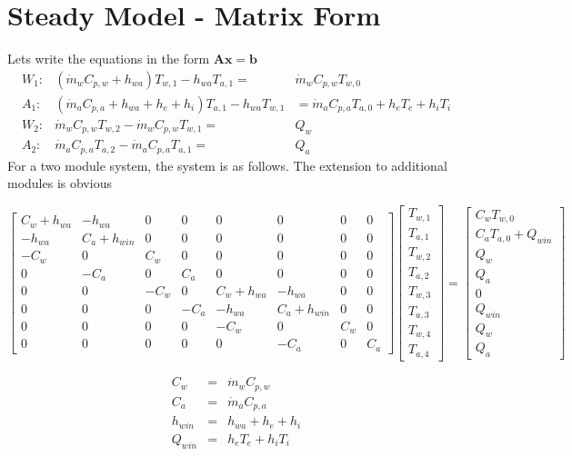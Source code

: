 \documentclass[11pt]{article}
\begin{document}
\section{Steady Model - Matrix Form}
Lets write the equations in the form $\mathbf{A}\mathbf{x}=\mathbf{b}$
\begin{eqnarray} 
W_1: &  (\dot{m}_wC_{p,w}+h_{wa})T_{w,1} - h_{wa}T_{a,1} = &\dot{m}_wC_{p,w}T_{w,0}  \\
A_1: &  (\dot{m}_aC_{p,a}+h_{wa}+h_e+h_i)T_{a,1} -h_{wa}T_{w,1} &= \dot{m}_aC_{p,a}T_{a,0} +h_eT_e+h_iT_i \\
W_2: &  \dot{m}_wC_{p,w}T_{w,2}-\dot{m}_wC_{p,w}T_{w,1} = &Q_w\\
A_2: &  \dot{m}_aC_{p,a}T_{a,2}-\dot{m}_aC_{p,a}T_{a,1} = &Q_a
\label{eq:steady2}
\end{eqnarray}
For a two module system, the system is as follows. The extension to additional modules is obvious
\begin{landscape}

\begin{equation}
\left[ \begin{array}{cccccccc} C_w+h_{wa}& - h_{wa} & 0 & 0 & 0 & 0 & 0 & 0 \\-h_{wa} & C_a+h_{win} & 0 & 0 & 0 & 0 & 0 & 0 \\ -C_w & 0 & C_w & 0 & 0 & 0 & 0 & 0 \\ 0 & -C_a & 0 & C_a & 0 & 0 & 0 & 0 \\ 0 & 0 & -C_w & 0 & C_w+h_{wa} & -h_{wa}& 0 & 0 \\ 0 & 0 & 0 & -C_a &  -h_{wa} & C_a+h_{win} & 0 & 0\\ 0 & 0 & 0 & 0 & -C_w & 0 & C_w & 0 \\ 0 & 0 & 0 & 0 & 0 & -C_a & 0 & C_a \end{array}\right]\left[ \begin{array}{l} T_{w,1} \\ T_{a,1} \\ T_{w,2} \\ T_{a,2} \\ T_{w,3} \\ T_{a,3} \\ T_{w,4} \\ T_{a,4} \end{array}\right] = \left[ \begin{array}{l} C_wT_{w,0} \\ C_aT_{a,0} + Q_{win} \\ Q_w \\ Q_a \\ 0 \\ Q_{win} \\ Q_w \\ Q_a\end{array}\right]
\end{equation}

\begin{eqnarray}
C_w &=& \dot{m}_wC_{p,w} \\
C_a &=& \dot{m}_aC_{p,a} \\
h_{win} &=& h_{wa}+h_e+h_i \\
Q_{win} &=& h_eT_e+h_iT_i
\end{eqnarray}
\end{landscape}
\end{document}
